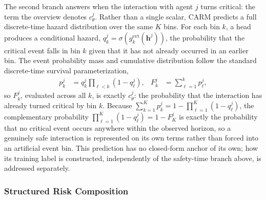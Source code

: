 \documentclass[letterpaper, 10 pt, conference]{ieeeconf}  %
\begin{document}
The second branch answers when the interaction with agent $j$ turns
critical: the term the overview denotes $c_\theta^j$. Rather than a single
scalar, CARM predicts a full discrete-time hazard distribution over the
same $K$ bins. For each bin $k$, a head produces a conditional hazard,
$q_k^j=\sigma(g_k^{\mathrm{evt}}(\bm h^j))$, the probability that the
critical event falls in bin $k$ given that it has not already occurred in
an earlier bin. The event probability mass and cumulative distribution
follow the standard discrete-time survival parameterization,
\begin{equation}
\begin{aligned}
p_k^j&=q_k^j\prod_{\ell<k}(1-q_\ell^j),
&F_k^j&=\sum_{\ell=1}^{k}p_\ell^j,
\end{aligned}
\label{eq:event_time_distribution}
\end{equation}
so $F_k^j$, evaluated across all $k$, is exactly $c_\theta^j$: the
probability that the interaction has already turned critical by bin $k$.
Because $\sum_{k=1}^{K}p_k^j=1-\prod_{\ell=1}^{K}(1-q_\ell^j)$, the
complementary probability $\prod_{\ell=1}^{K}(1-q_\ell^j)=1-F_K^j$ is
exactly the probability that no critical event occurs anywhere within the
observed horizon, so a genuinely safe interaction is represented on its
own terms rather than forced into an artificial event bin. This
prediction has no closed-form anchor of its own; how its training label
is constructed, independently of the safety-time branch above, is
addressed separately.

\subsubsection{Structured Risk Composition}
\end{document}
